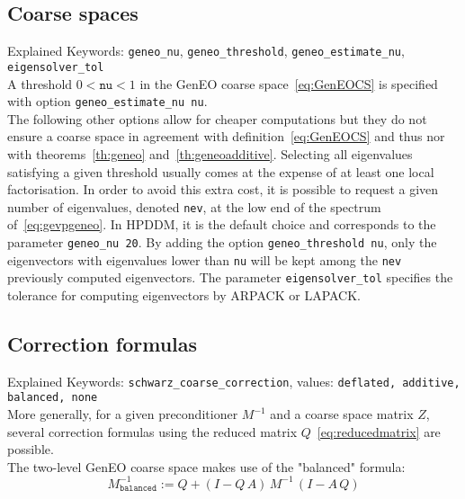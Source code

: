 \documentclass{article}
\begin{document}
\subsection{Coarse spaces}
Explained Keywords: \texttt{geneo\_nu}, \texttt{geneo\_threshold}, \texttt{geneo\_estimate\_nu}, \texttt{eigensolver\_tol}\\


A threshold $0< \texttt{nu} <1$ in the GenEO coarse space~\eqref{eq:GenEOCS} is specified with option \texttt{geneo\_estimate\_nu nu}.\\
The following other options allow for cheaper computations but they do not ensure a coarse space in agreement with definition~\eqref{eq:GenEOCS} and thus nor with theorems~\ref{th:geneo} and~\ref{th:geneoadditive}. Selecting all eigenvalues satisfying a given threshold usually comes at the expense of at least one local factorisation. In order to avoid this extra cost, it is possible to request a given number of eigenvalues, denoted \texttt{nev}, at the low end of the spectrum of~\eqref{eq:gevpgeneo}.  In HPDDM, it is the default choice and corresponds to the parameter \texttt{geneo\_nu 20}.  By adding the option \texttt{geneo\_threshold nu}, only the eigenvectors with eigenvalues lower than \texttt{nu} will be kept among the \texttt{nev} previously computed eigenvectors. The parameter \texttt{eigensolver\_tol} specifies the tolerance for computing eigenvectors by ARPACK or LAPACK. 


\subsection{Correction formulas}
Explained Keywords: \texttt{schwarz\_coarse\_correction}, values: \texttt{deflated, additive, balanced, none}\\

More generally, for a given preconditioner $M^{-1}$ and a coarse space matrix $Z$, several correction formulas using the reduced matrix $Q$~\eqref{eq:reducedmatrix} are possible. \\

The two-level GenEO coarse space makes use of the "balanced" formula:
\begin{equation}
  \label{eq:bnn}
  \boxed{
 M_{\texttt{balanced}}^{-1} := Q+(I-Q\,A)\,M^{-1}\,(I-A\,Q)
 }
\end{equation}
\end{document}
